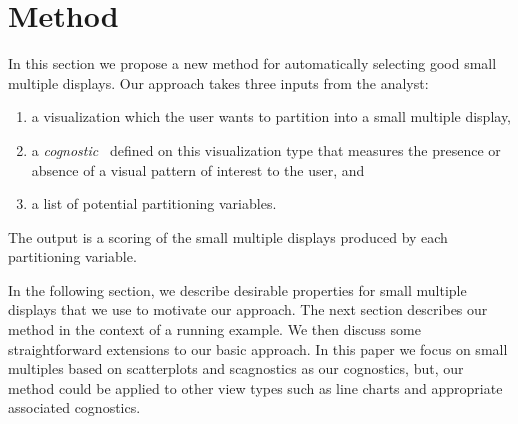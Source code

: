 \section{Method}
\label{sec:method}

In this section we propose a new method for automatically selecting good small multiple displays. Our approach takes three inputs from the analyst:
\begin{enumerate}
\item a visualization which the user wants to partition into a small multiple display,
\item a \textit{cognostic}~\cite{Tukey1982,Tukey1985} defined on this visualization type that measures the presence or absence of a visual pattern of interest to the user, and
\item a list of potential partitioning variables.
\end{enumerate}
The output is a scoring of the small multiple displays produced by each partitioning variable.

In the following section, we describe desirable properties for small multiple displays that we use to motivate our approach. The next section describes our method in the context of a running example. We then discuss some straightforward extensions to our basic approach. In this paper we focus on small multiples based on scatterplots and scagnostics as our cognostics, but, our method could be applied to other view types such as line charts and appropriate associated cognostics.

